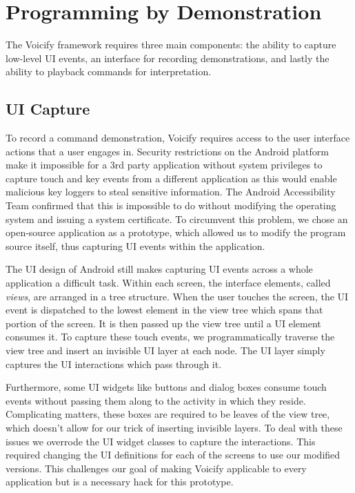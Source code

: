 \documentclass[letterpaper]{article}
\begin{document}


\section{Programming by Demonstration}
The Voicify framework requires three main components: the ability to capture low-level UI events, 
an interface for recording demonstrations, and lastly the ability to playback commands for interpretation.

\subsection{UI Capture}
To record a command demonstration, Voicify requires access to the user interface actions that a user engages in.
Security restrictions on the Android platform make it impossible for a 3rd party application without system privileges to capture 
touch and key events from a different application as this would enable malicious key loggers to steal sensitive information. 
The Android Accessibility Team \cite{androidaccessibility} confirmed that this is impossible to do without modifying the operating
system and issuing a system certificate.
To circumvent this problem, we chose an open-source application as a prototype, which allowed us to modify
the program source itself, thus capturing UI events within the application.

The UI design of Android still makes capturing UI events across a whole application a difficult task.
Within each screen, the interface elements, called \emph{views}, are arranged in a tree structure. When the user
touches the screen, the UI event is dispatched to the lowest element in the view tree which spans that portion of the 
screen. It is then passed up the view tree until a UI element consumes it. To capture these touch events,
we programmatically traverse the view tree and insert an invisible UI layer at each node. The UI layer
simply captures the UI interactions which pass through it.

Furthermore, some UI widgets like buttons and dialog boxes consume touch events without passing them along
to the activity in which they reside. Complicating matters, these boxes are required to be leaves
of the view tree, which doesn't allow for our trick of inserting invisible layers. To deal with these issues
we overrode the UI widget classes to capture the interactions. This required changing the UI definitions for
each of the screens to use our modified versions. This challenges our goal of making Voicify applicable to
every application but is a necessary hack for this prototype.
\end{document}
